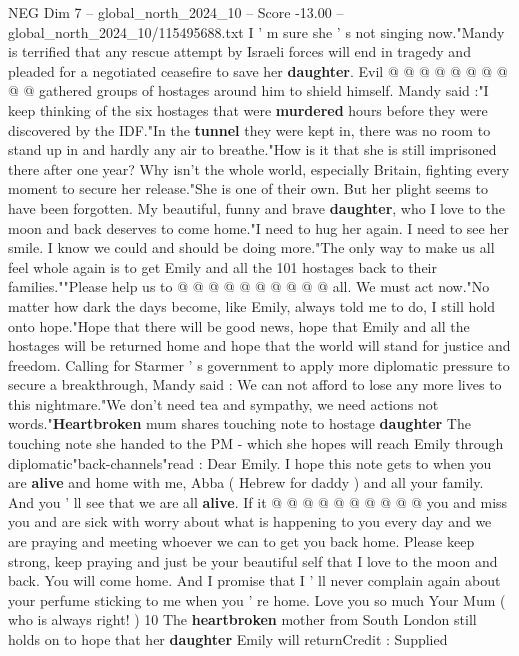 \begin{textsample}{NEG Dim 7 – global\_north\_2024\_10 – Score -13.00 – global\_north\_2024\_10/115495688.txt}
I ' m sure she ' s not singing now."Mandy is terrified that any rescue attempt by Israeli forces will end in tragedy and pleaded for a negotiated ceasefire to save her \textbf{daughter}.
Evil @ @ @ @ @ @ @ @ @ @ gathered groups of hostages around him to shield himself.
Mandy said :"I keep thinking of the six hostages that were \textbf{murdered} hours before they were discovered by the IDF."In the \textbf{tunnel} they were kept in, there was no room to stand up in and hardly any air to breathe."How is it that she is still imprisoned there after one year?
Why isn't the whole world, especially Britain, fighting every moment to secure her release."She is one of their own.
But her plight seems to have been forgotten.
My beautiful, funny and brave \textbf{daughter}, who I love to the moon and back deserves to come home."I need to hug her again.
I need to see her smile.
I know we could and should be doing more."The only way to make us all feel whole again is to get Emily and all the 101 hostages back to their families.""Please help us to @ @ @ @ @ @ @ @ @ @ all.
We must act now."No matter how dark the days become, like Emily, always told me to do, I still hold onto hope."Hope that there will be good news, hope that Emily and all the hostages will be returned home and hope that the world will stand for justice and freedom.
Calling for Starmer ' s government to apply more diplomatic pressure to secure a breakthrough, Mandy said : We can not afford to lose any more lives to this nightmare."We don't need tea and sympathy, we need actions not words."\textbf{Heartbroken} mum shares touching note to hostage \textbf{daughter} The touching note she handed to the PM - which she hopes will reach Emily through diplomatic"back-channels"read : Dear Emily.
I hope this note gets to when you are \textbf{alive} and home with me, Abba ( Hebrew for daddy ) and all your family.
And you ' ll see that we are all \textbf{alive}.
If it @ @ @ @ @ @ @ @ @ @ you and miss you and are sick with worry about what is happening to you every day and we are praying and meeting whoever we can to get you back home.
Please keep strong, keep praying and just be your beautiful self that I love to the moon and back.
You will come home.
And I promise that I ' ll never complain again about your perfume sticking to me when you ' re home.
Love you so much Your Mum ( who is always right! ) 10 The \textbf{heartbroken} mother from South London still holds on to hope that her \textbf{daughter} Emily will returnCredit : Supplied

\end{textsample}
